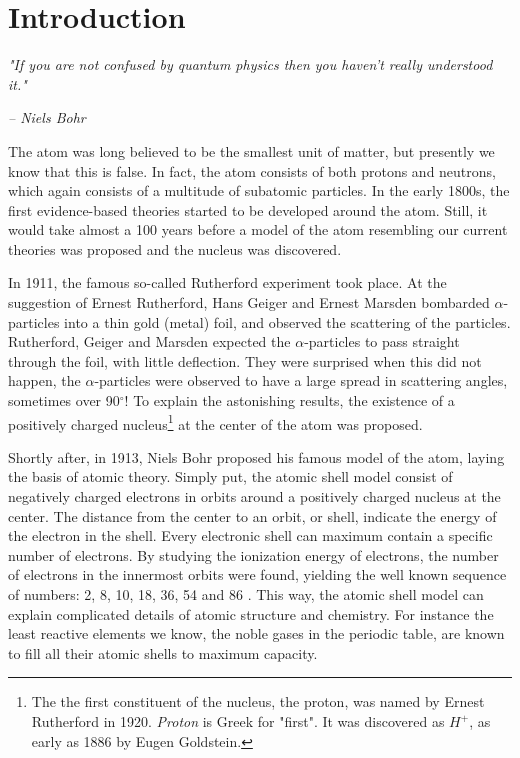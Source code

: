 \documentclass[twoside,english]{uiofysmaster/uiofysmaster}
\begin{document}
\tableofcontents


\chapter{Introduction}\label{ch:intro}
\epigraph{\textit{"If you are not confused by quantum physics then you haven't really understood it."}}{\textit{– Niels Bohr}}


The atom was long believed to be the smallest unit of matter, but presently we know that this is false. 
In fact, the atom consists of both protons and neutrons, which again consists of a multitude of subatomic particles.
In the early 1800s, the first evidence-based theories started to be developed around the atom.
Still, it would take almost a 100 years before a model of the atom resembling our current theories was proposed and the nucleus was discovered. 

In 1911, the famous so-called Rutherford experiment took place.
At the suggestion of Ernest Rutherford, Hans Geiger and Ernest Marsden bombarded $\alpha$-particles into a thin gold (metal) foil, and observed the scattering of the particles.
Rutherford, Geiger and Marsden expected the $\alpha$-particles to pass straight through the foil, with little deflection. 
They were surprised when this did not happen, the $\alpha$-particles were observed to have a large spread in scattering angles, sometimes over 90$^\circ$!
To explain the astonishing results, the existence of a positively charged nucleus\footnote{The the first constituent of the nucleus, the proton, was named by Ernest
Rutherford in 1920. \textit{Proton} is Greek for "first". It was discovered as $H^+$, as early as 1886 by Eugen Goldstein.} at the center of the atom was proposed. 

Shortly after, in 1913, Niels Bohr proposed his famous model of the atom, laying the basis of atomic theory.
Simply put, the atomic shell model consist of negatively charged electrons in orbits around a positively charged nucleus at the center. 
The distance from the center to an orbit, or shell, indicate the energy of the electron in the shell. 
Every electronic shell can maximum contain a specific number of electrons. 
By studying the ionization energy of electrons, the number of electrons in the innermost orbits were found, yielding the well known sequence of numbers: 2, 8, 10, 18, 36, 54 and 86 \cite{Heyde}. 
This way, the atomic shell model can explain complicated details of atomic structure and chemistry. 
For instance the least reactive elements we know, the noble gases in the periodic table, are known to fill all their atomic shells to maximum capacity.
\end{document}
